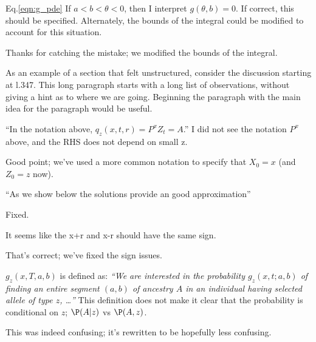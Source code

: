 \begin{point}{Eq.\ref{eqn:g_pde}}
If $a<b<\theta<0$, then I interpret $g(\theta,b) = 0$. If correct, this should be specified.  Alternately, the bounds of the integral could be modified to account for this situation.
\end{point}

\reply
Thanks for catching the mistake; we modified the bounds of the integral.

\begin{point}{}
As an example of a section that felt unstructured, consider the discussion starting at l.347.  This long paragraph starts with a long list of observations, without giving a hint as to where we are going. Beginning the paragraph with the main idea for the paragraph would be useful.
\end{point}

\reply
{}

\begin{point}{\revref}
``In the notation above, $q_z(x, t, r) = P^x{Z_t = A}$.''
I did not see the notation $P^x$ above, and the RHS does not depend on small z.
\end{point}

\reply
Good point; we've used a more common notation to specify that $X_0=x$ (and $Z_0=z$ now).

\begin{point}{} 
``As we show below the solutions provide an good approximation''
\end{point}

\reply
Fixed.

\begin{point}{\revref}
It seems like the x+r and x-r should have the same sign.
\end{point}

\reply
That's correct; we've fixed the sign issues.

\begin{point}{\revref}
$g_z(x, T, a,b)$ is defined as: \textit{``We are interested in the probability $g_z(x, t; a, b)$ of finding an entire segment $(a, b)$ of ancestry $A$ in an individual having selected allele of type $z$, \ldots ''}
This definition does not make it clear that the probability is conditional on $z$; $\P(A|z)$ vs $\P(A,z)$.
\end{point}

\reply
This was indeed confusing; it's rewritten to be hopefully less confusing.

